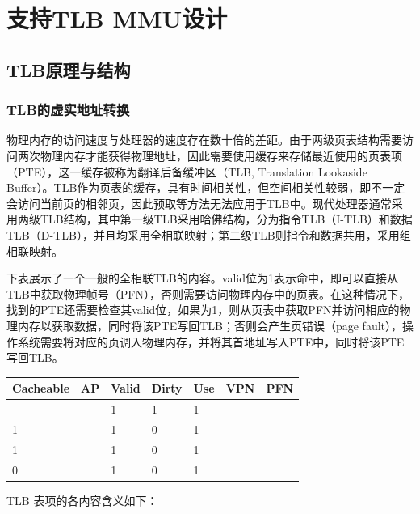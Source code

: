
\chapter{支持TLB MMU设计}\label{chap:10-mmu}

\section{TLB原理与结构}\label{sec:10-mmu-001}

\subsection{TLB的虚实地址转换}\label{sec:10-mmu-002}

物理内存的访问速度与处理器的速度存在数十倍的差距。由于两级页表结构需要访问两次物理内存才能获得物理地址，因此需要使用缓存来存储最近使用的页表项（PTE），这一缓存被称为翻译后备缓冲区（TLB, Translation Lookaside Buffer）。TLB作为页表的缓存，具有时间相关性，但空间相关性较弱，即不一定会访问当前页的相邻页，因此预取等方法无法应用于TLB中。现代处理器通常采用两级TLB结构，其中第一级TLB采用哈佛结构，分为指令TLB（I-TLB）和数据TLB（D-TLB），并且均采用全相联映射；第二级TLB则指令和数据共用，采用组相联映射。

下表展示了一个一般的全相联TLB的内容。valid位为1表示命中，即可以直接从TLB中获取物理帧号（PFN），否则需要访问物理内存中的页表。在这种情况下，找到的PTE还需要检查其valid位，如果为1，则从页表中获取PFN并访问相应的物理内存以获取数据，同时将该PTE写回TLB；否则会产生页错误（page fault），操作系统需要将对应的页调入物理内存，并将其首地址写入PTE中，同时将该PTE写回TLB。

\begin{longtable}[]{@{}lllllll@{}}
\toprule\noalign{}
Cacheable & AP & Valid & Dirty & Use & VPN & PFN \\
\midrule\noalign{}
\endhead
\bottomrule\noalign{}
\endlastfoot
1 & & 1 & 1 & 1 & & \\
1 & & 1 & 0 & 1 & & \\
1 & & 1 & 0 & 1 & & \\
0 & & 1 & 0 & 1 & & \\
\end{longtable}

TLB 表项的各内容含义如下：


